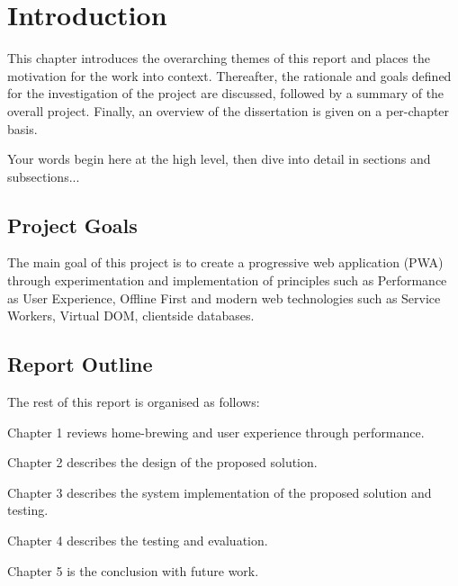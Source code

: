 \chapter{Introduction} \label{i}

This chapter introduces the overarching themes of this report and places the motivation for the work into context. Thereafter, the rationale and goals defined for the investigation of the project are discussed, followed by a summary of the overall project. Finally, an overview of the dissertation is given on a per-chapter basis.

Your words begin here at the high level, then dive into detail in sections and subsections...

\section{Project Goals} \label{i--project-goals}

The main goal of this project is to create a progressive web application (PWA) through experimentation and implementation of principles such as Performance as User Experience, Offline First and modern web technologies such as Service Workers, Virtual DOM, clientside databases.

\section{Report Outline} \label{i--report-outline}

The rest of this report is organised as follows:

Chapter 1 reviews home-brewing and user experience through performance.

Chapter 2 describes the design of the proposed solution.

Chapter 3 describes the system implementation of the proposed solution and testing.

Chapter 4 describes the testing and evaluation.

Chapter 5 is the conclusion with future work.
